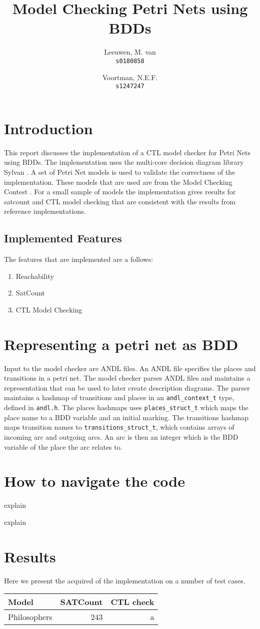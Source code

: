 \documentclass[twoside, a4paper]{article}
\title{Model Checking Petri Nets using BDDs}
\author{Leeuwen, M. van\\
  \texttt{s0180858}\\
  \and
  Voortman, N.E.F.\\
  \texttt{s1247247}
}
\begin{document}
\maketitle

\section{Introduction}
This report discusses the implementation of a CTL model checker for Petri Nets using BDDs. The implementation uses the multi-core decision diagram library Sylvan \parencite{sylvan}. A set of Petri Net models is used to validate the correctness of the implementation. These models that are used are from the Model Checking Contest \parencite{mcc:2017}. For a small sample of models the implementation gives results for satcount and CTL model checking that are consistent with the results from reference implementations.

\subsection{Implemented Features}

The features that are implemented are a follows:
\begin{enumerate}
\item Reachability
\item SatCount
\item CTL Model Checking
\end{enumerate}
\section{Representing a petri net as BDD}
Input to the model checker are ANDL files. An ANDL file specifies the places and transitions in a petri net. The model checker parses ANDL files and maintains a representation that can be used to later create description diagrams. The parser maintains a hashmap of transitions and places in an \texttt{andl\_context\_t} type, defined in \texttt{andl.h}. The places hashmaps uses \texttt{places\_struct\_t} which maps the place name to a BDD variable and an initial marking. The transitions hashmap maps transition names to \texttt{transitions\_struct\_t}, which contains arrays of incoming arc and outgoing arcs. An arc is then an integer which is the BDD variable of the place the arc relates to.


\section{How to navigate the code}
\begin{description}[align=left]
\item [bdd-util.c:50] explain
\item [petri-util.c:50] explain
\end{description}


\section{Results}
Here we present the acquired of the implementation on a number of test cases.

\begin{tabular}[pos]{l | r | r}
  Model & SATCount & CTL check \\
  \hline
  Philosophers & 243 & a\\
\end{tabular}


\printbibliography
\end{document}
